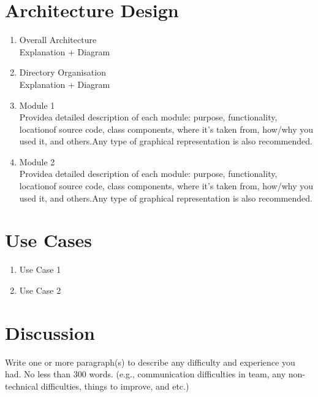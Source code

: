\documentclass[10pt]{article}
\begin{document}
\begin{multicols*}{2}
\clearpage

\section{Architecture Design}

\begin{enumerate}
  \item {Overall Architecture} \\
  Explanation + Diagram
  \item {Directory Organisation} \\
  Explanation + Diagram
  \item {Module 1} \\
  Providea detailed description of each module: purpose, functionality, locationof source code, class components, where it’s taken from, how/why you used it, and others.Any type of graphical representation is also recommended.
  \item {Module 2} \\
  Providea detailed description of each module: purpose, functionality, locationof source code, class components, where it’s taken from, how/why you used it, and others.Any type of graphical representation is also recommended.
\end{enumerate}

\clearpage

\section{Use Cases}
\begin{enumerate}
  \item {Use Case 1} \\
  \item {Use Case 2} \\
\end{enumerate}

\clearpage

\section{Discussion} 

Write one or more paragraph(s) to describe any difficulty and experience you had. No less than 300 words. (e.g., communication difficulties in team, any non-technical difficulties, things to improve, and etc.)

\end{multicols*}

\clearpage
\end{document}
